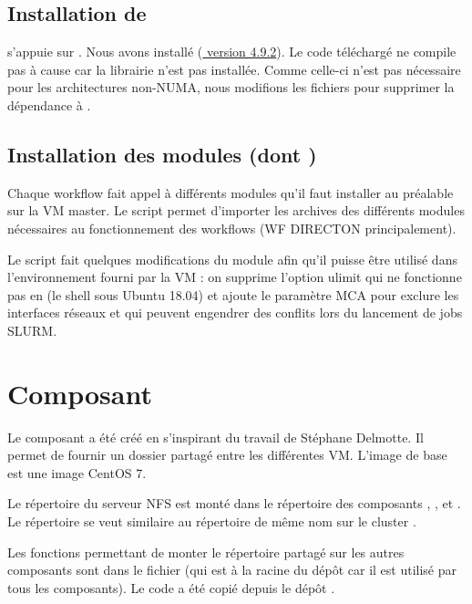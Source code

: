 \subsection{Installation de }

 s'appuie sur .
Nous avons installé (\href{https://github.com/pegasus-isi/pegasus/archive/4.9.2.zip}{ version 4.9.2}).
Le code téléchargé ne compile pas à cause car la librairie  n'est pas installée.
Comme celle-ci n'est pas nécessaire pour les architectures non-NUMA, nous modifions les fichiers 
pour supprimer la dépendance à .

\subsection{Installation des modules (dont )}

Chaque workflow fait appel à différents modules qu'il faut installer au préalable sur la VM master.
Le script  permet d'importer les archives des différents modules nécessaires au fonctionnement des workflows (WF DIRECTON principalement).

Le script  fait quelques modifications du module  afin qu'il puisse être utilisé dans l'environnement fourni par la VM :
on supprime l'option ulimit qui ne fonctionne pas en  (le shell sous Ubuntu 18.04)
et ajoute le paramètre MCA  pour exclure les interfaces réseaux  et  qui peuvent engendrer des conflits lors du lancement de jobs SLURM.


\section{Composant } \label{nfsserver}

Le composant  a été créé en s'inspirant du travail de Stéphane Delmotte.
Il permet de fournir un dossier partagé entre les différentes VM.
L'image de base est une image CentOS 7.

Le répertoire  du serveur NFS est monté dans le répertoire 
des composants , ,  et .
Le répertoire  se veut similaire au répertoire de même nom sur le cluster .

Les fonctions permettant de monter le répertoire partagé sur les autres composants sont dans le fichier 
(qui est à la racine du dépôt  car il est utilisé par tous les composants).
Le code a été copié depuis le dépôt .

